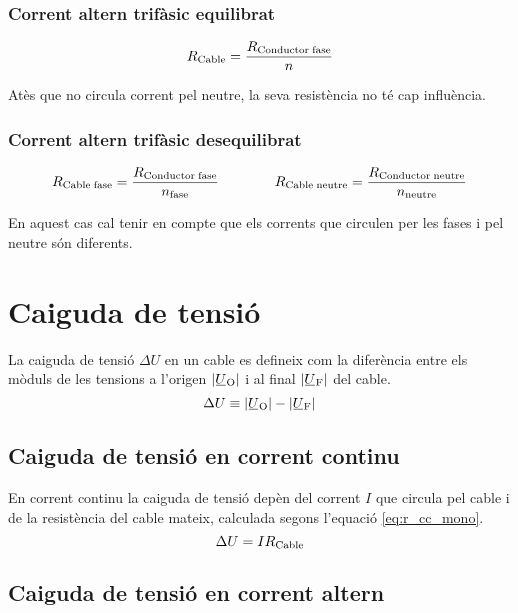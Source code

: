 \subsubsection*{Corrent altern trifàsic equilibrat}
\vspace{-5mm}
\begin{equation}\label{eq:r_trifas}
R_\mathrm{Cable} = \frac{R_\mathrm{Conductor\;fase}}{n}
\end{equation}

Atès que no circula corrent pel neutre, la seva resistència no  té cap influència.

\subsubsection*{Corrent altern trifàsic desequilibrat}
\begin{equation}
    R_\mathrm{Cable\;fase} = \frac{R_\mathrm{Conductor\;fase}}{n_\mathrm{fase}} \qquad\qquad
    R_\mathrm{Cable\; neutre} = \frac{R_\mathrm{Conductor\;neutre}}{n_\mathrm{neutre}}
\end{equation}

En aquest cas cal tenir en compte que els corrents que circulen per les fases i pel neutre
són diferents.


\section{Caiguda de tensió}

La caiguda de tensió $\Delta U$ en un cable es defineix com la diferència entre els mòduls de les tensions a l'origen $|{\cmplx{U}\ped{O}}|$ i al final $|\cmplx{U}\ped{F}|$ del cable.
\begin{equation}
   \Delta U \equiv |\cmplx{U}\ped{O}| - |\cmplx{U}\ped{F}|
\end{equation}

\subsection{Caiguda de tensió en corrent continu}

En corrent continu la caiguda de tensió depèn del corrent $I$ que circula pel cable i de la  resistència del  cable mateix, calculada segons l'equació \eqref{eq:r_cc_mono}.
\begin{equation}
   \Delta U = I R_\mathrm{Cable}
\end{equation}

\subsection{Caiguda de tensió en corrent altern}


